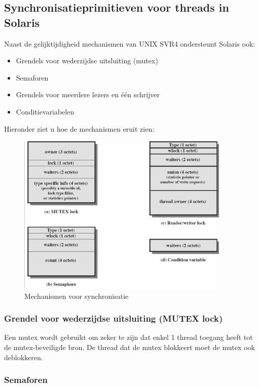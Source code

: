 \subsection{Synchronisatieprimitieven voor threads in Solaris}

Naast de gelijktijdigheid mechanismen van UNIX SVR4 ondersteunt Solaris ook:
\begin{itemize}
\item Grendels voor wederzijdse uitsluiting (mutex)
\item Semaforen
\item Grendels voor meerdere lezers en één schrijver
\item Conditievariabelen
\end{itemize}

Hieronder ziet u hoe de mechanismen eruit zien:

\begin{figure}[htp]
    \centering
            \includegraphics[width=4in]{img/mechanismen}
        \caption{Mechanismen voor synchronisatie }
    \label{fig:Mechanismen voor synchronisatie}
\end{figure}

\subsubsection{Grendel voor wederzijdse uitsluiting (MUTEX lock)}

Een mutex wordt gebruikt om zeker te zijn dat enkel 1 thread toegang heeft tot de mutex-beveiligde bron. De thread dat de mutex blokkeert moet de mutex ook deblokkeren.

\subsubsection{Semaforen}

